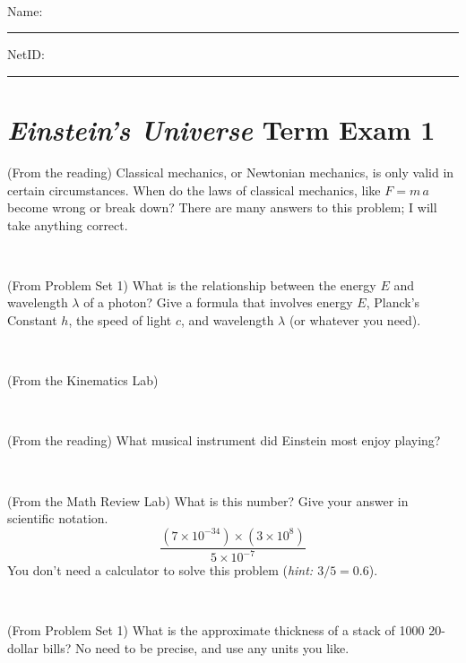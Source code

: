 \documentclass[12pt, letterpaper]{article}
\begin{document}
\vfill ~


\cleardoublepage



\noindent
Name: \rule[-1ex]{0.60\textwidth}{0.1pt}
NetID: \rule[-1ex]{0.20\textwidth}{0.1pt}

\section*{\textsl{Einstein's Universe} Term Exam 1}
\setcounter{problem}{1}


\begin{problem} (From the reading)
Classical mechanics, or Newtonian mechanics, is only valid in certain
circumstances. When do the laws of classical mechanics, like $F =
m\,a$ become wrong or break down? There are many answers to this
problem; I will take anything correct.
\end{problem}


\vfill ~

\begin{problem} (From Problem Set 1)
What is the relationship between the energy $E$ and wavelength
$\lambda$ of a photon? Give a formula that involves energy $E$,
Planck's Constant $h$, the speed of light $c$, and wavelength
$\lambda$ (or whatever you need).
\end{problem}

\vfill ~

\begin{problem} (From the Kinematics Lab)

\end{problem}


\vfill ~

\begin{problem} (From the reading)
What musical instrument did Einstein most enjoy playing?
\end{problem}


\vfill ~


\clearpage


\begin{problem} (From the Math Review Lab)
What is this number? Give your answer in scientific notation.
$$
\frac{(7\times10^{-34})\times(3\times10^8)}{5\times10^{-7}}
$$
You don't need a calculator to solve this problem (\textit{hint: $3/5=0.6$}).
\end{problem}


\vfill ~

\begin{problem} (From Problem Set 1)
What is the approximate thickness of a stack of 1000 20-dollar bills?
No need to be precise, and use any units you like.
\end{problem}
\end{document}
